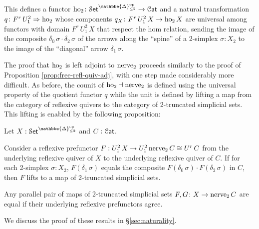 \documentclass[a4paper,UKenglish,cleveref, autoref, thm-restate]{lipics-v2021}
\newcommand{\op}{\textup{op}}
\newcommand{\ho}{\textup{ho}}
\newcommand{\nerve}{\textup{nerve}}
\newcommand{\cat}[1]{\textup{\textsf{#1}}}%
\newcommand{\1}{\mathbbe{1}}
\newcommand{\2}{\mathbbe{2}}
\newcommand{\3}{\mathbbe{3}}
\newcommand{\DDelta}{\mathbbe{\Delta}}
\newcommand{\Cat}{\mathcal{C}\cat{at}}
\newcommand{\Set}{\mathcal{S}\cat{et}}
\newcommand{\cdocTwo}[3][]{\href{https://leanprover-community.github.io/mathlib4_docs/find/?pattern=CategoryTheory.#1#2\%E2\%82\%82#3\#doc}{\texttt{#2${}_2$#3}}}
\begin{document}
This defines a functor $\ho_2 \colon \Set^{\DDelta_{\leq 2}^\op} \to \Cat$ and a natural transformation $q \colon F^r\, U^2_1 \Rightarrow \ho_2$ whose components $q_X \colon F^r\, U^2_1\, X \to \ho_2\,X$ are universal among functors with domain $F^r\, U^2_1\, X$ that respect the hom relation, sending the image of the composite $\delta_0\, \sigma \cdot \delta_2\, \sigma$ of the arrows along the ``spine'' of a 2-simplex $\sigma : X_2$ to the image of the ``diagonal'' arrow $\delta_1\, \sigma$.


The proof that $\ho_2$ is left adjoint to $\nerve_2$ proceeds similarly to the proof of Proposition \ref{prop:free-refl-quiv-adj}, with one step made considerably more difficult. As before, the counit of $\ho_2 \dashv \nerve_2$ is defined using the universal property of the quotient functor $q$ while the unit is defined by lifting a map from the category of reflexive quivers to the category of 2-truncated simplicial sets. This lifting is enabled by the following proposition:

\begin{proposition}[\cdocTwo{toNerve}{.mk}, \cdocTwo{toNerve}{.ext}]\label{prop:to-nerve2-mk}
Let $X : \Set^{\DDelta_{\leq 2}^\op}$ and $C : \Cat$.

\begin{romanenumerate}
\item Consider a reflexive prefunctor $F : U^2_1\, X \to U^2_1\, \nerve_2\, C \cong U^r\, C$ from the underlying reflexive quiver of $X$ to the underlying reflexive quiver of $C$. If for each 2-simplex $\sigma : X_2$, $F(\delta_1\, \sigma)$ equals the composite $F(\delta_0\, \sigma) \cdot F(\delta_2\, \sigma)$ in $C$, then $F$ lifts to a map of 2-truncated simplicial sets.
\item Any parallel pair of maps  of 2-truncated simplicial sets $F,G \colon X \to \nerve_2\, C$ are equal if their underlying reflexive prefunctors agree.
\end{romanenumerate}
\end{proposition}

We discuss the proof of these results in \S\ref{sec:naturality}.
\end{document}
